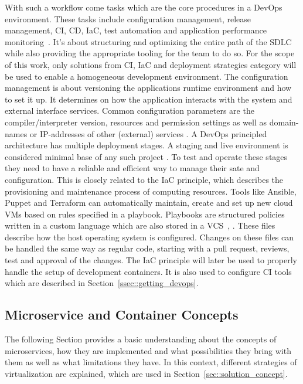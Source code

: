 \documentclass[12pt, a4paper]{article}
\begin{document}
        \noindent With such a workflow come tasks which are the core procedures in a DevOps environment. These tasks include configuration management, release management, \ac{CI}, \ac{CD}, \ac{IaC}, test automation and application performance monitoring~\cite{azuredevops}. It's about structuring and optimizing the entire path of the \ac{SDLC} while also providing the appropriate tooling for the team to do so.\newline
        For the scope of this work, only solutions from \ac{CI}, \ac{IaC} and deployment strategies category will be used to enable a homogeneous development environment. The configuration management is about versioning the applications runtime environment and how to set it up. It determines on how the application interacts with the system and external interface services. Common configuration parameters are the compiler/interpreter version, resources and permission settings as well as domain-names or \acs{IP}-addresses of other (external) services \cite{base_devops}.\newline
        A DevOps principled architecture has multiple deployment stages. A staging and live environment is considered minimal base of any such project \cite{azuredevops}. To test and operate these stages they need to have a reliable and efficient way to manage their sate and configuration. This is closely related to the \ac{IaC} principle, which describes the provisioning and maintenance process of computing resources. Tools like Ansible, Puppet and Terraform can automatically maintain, create and set up new cloud \ac{VM}s based on rules specified in a playbook. Playbooks are structured policies written in a custom language which are also stored in a \ac{VCS}~\cite{ansible2020}, \cite{azuredevops}. These files describe how the host operating system is configured. Changes on these files can be handled the same way as regular code, starting with a pull request, reviews, test and approval of the changes. The \acl{IaC} principle will later be used to properly handle the setup of development containers. It is also used to configure \acs{CI} tools which are described in Section~\ref{ssec::getting_devops}.

    \subsection{Microservice and Container Concepts}\label{ssec::microservices}
    The following Section provides a basic understanding about the concepts of microservices, how they are implemented and what possibilities they bring with them as well as what limitations they have. In this context, different strategies of virtualization are explained, which are used in Section~\ref{sec::solution_concept}.
\end{document}
